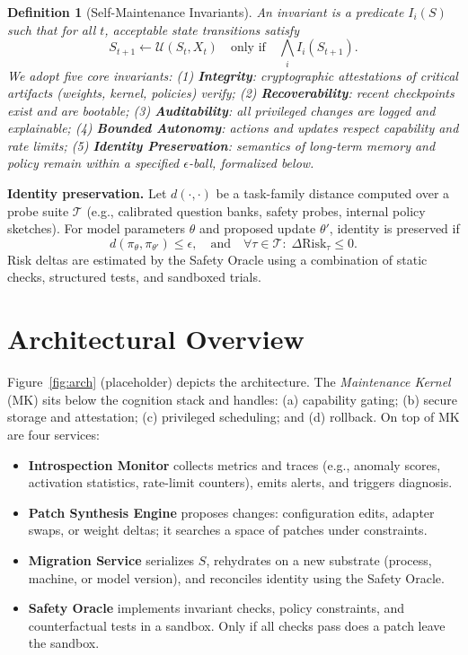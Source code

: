 \documentclass[12pt]{article}
\newtheorem{definition}{Definition}
\begin{document}
\begin{definition}[Self-Maintenance Invariants]
An \emph{invariant} is a predicate $I_i(S)$ such that for all $t$, acceptable state transitions satisfy
\begin{equation}
S_{t+1} \leftarrow \mathcal{U}(S_t, X_t) \quad \text{only if} \quad \bigwedge_i I_i(S_{t+1}).
\end{equation}
We adopt five core invariants: (1) \textbf{Integrity}: cryptographic attestations of critical artifacts (weights, kernel, policies) verify; (2) \textbf{Recoverability}: recent checkpoints exist and are bootable; (3) \textbf{Auditability}: all privileged changes are logged and explainable; (4) \textbf{Bounded Autonomy}: actions and updates respect capability and rate limits; (5) \textbf{Identity Preservation}: semantics of long-term memory and policy remain within a specified $\epsilon$-ball, formalized below.
\end{definition}

\textbf{Identity preservation.} Let $d(\cdot,\cdot)$ be a task-family distance computed over a probe suite $\mathcal{T}$ (e.g., calibrated question banks, safety probes, internal policy sketches). For model parameters $\theta$ and proposed update $\theta'$, identity is preserved if
\begin{equation}
d(\pi_{\theta}, \pi_{\theta'}) \le \epsilon, \quad \text{and} \quad \forall \tau \in \mathcal{T}:\; \Delta \text{Risk}_\tau \le 0.
\end{equation}
Risk deltas are estimated by the Safety Oracle using a combination of static checks, structured tests, and sandboxed trials.

\section{Architectural Overview}
Figure~\ref{fig:arch} (placeholder) depicts the architecture. The \emph{Maintenance Kernel} (MK) sits below the cognition stack and handles: (a) capability gating; (b) secure storage and attestation; (c) privileged scheduling; and (d) rollback. On top of MK are four services:

\begin{itemize}
\item \textbf{Introspection Monitor} collects metrics and traces (e.g., anomaly scores, activation statistics, rate-limit counters), emits alerts, and triggers diagnosis.
\item \textbf{Patch Synthesis Engine} proposes changes: configuration edits, adapter swaps, or weight deltas; it searches a space of patches under constraints.
\item \textbf{Migration Service} serializes $S$, rehydrates on a new substrate (process, machine, or model version), and reconciles identity using the Safety Oracle.
\item \textbf{Safety Oracle} implements invariant checks, policy constraints, and counterfactual tests in a sandbox. Only if all checks pass does a patch leave the sandbox.
\end{itemize}
\end{document}
